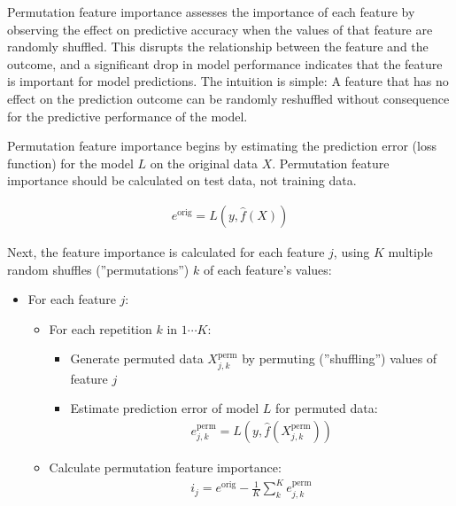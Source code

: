 Permutation feature importance assesses the importance of each feature by observing the effect on predictive accuracy when the values of that feature are randomly shuffled. This disrupts the relationship between the feature and the outcome, and a significant drop in model performance indicates that the feature is important for model predictions. The intuition is simple: A feature that has no effect on the prediction outcome can be randomly reshuffled without consequence for the predictive performance of the model.

Permutation feature importance begins by estimating the prediction error (loss function) for the model $L$ on the original data $X$. Permutation feature importance should be calculated on test data, not training data.

\begin{align*}
e^{\text{orig}} = L(y, \hat{f}(X))
\end{align*}

\begin{samepage}
Next, the feature importance is calculated for each feature $j$, using $K$ multiple random shuffles (''permutations'') $k$ of each feature's values:

\begin{itemize}
\item For each feature $j$:
  \begin{itemize}
     \item For each repetition $k$ in $1 \cdots K$:
     \begin{itemize}
        \item Generate permuted data $X^{\text{perm}}_{j, k}$ by permuting (''shuffling'') values of feature $j$
        \item Estimate prediction error of model $L$ for permuted data:
        \begin{align*}e^{\text{perm}}_{j, k} = L(y, \hat{f}(X^{\text{perm}}_{j, k}))\end{align*}
     \end{itemize}
     \item Calculate permutation feature importance: 
     \begin{align*}i_j = e^{\text{orig}} - \frac{1}{K}\sum_k^K e^{\text{perm}}_{j, k}\end{align*}
  \end{itemize}
\end{itemize}
\end{samepage}


